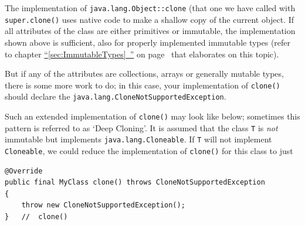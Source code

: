 \documentclass[11pt,a4paper, titlepage, parskip=half, headsepline, footsepline, cleardoublepage=current, headheight=1cm]{scrbook}
\newcommand*{\tqfullvref}[1]{\hyperref[{#1}]{“\ref*{#1}~\nameref*{#1}”} on page~\pageref{#1}}
\begin{document}
The implementation of \lstinline|java.lang.Object::clone| (that one we have called with \lstinline|super.clone()| uses native code to make a shallow copy of the current object. If all attributes of the class are either primitives or immutable, the implementation shown above is sufficient, also for properly implemented immutable types (refer to chapter \tqfullvref{sec:ImmutableTypes} that elaborates on this topic).

But if any of the attributes are collections, arrays or generally mutable types, there is some more work to do; in this case, your implementation of \lstinline|clone()| should declare the \lstinline|java.lang.CloneNotSupportedException|.

Such an extended implementation of \lstinline|clone()| may look like below; sometimes this pattern is referred to as ‘Deep Cloning’. It is assumed that the class \lstinline|T| is \textit{not} immutable but implements \lstinline|java.lang.Cloneable|. If \lstinline|T| will not implement \lstinline|Cloneable|, we could reduce the implementation of \lstinline|clone()| for this class to just
\begin{lstlisting}
@Override
public final MyClass clone() throws CloneNotSupportedException
{
    throw new CloneNotSupportedException();
}   //  clone()
\end{lstlisting}
\end{document}
